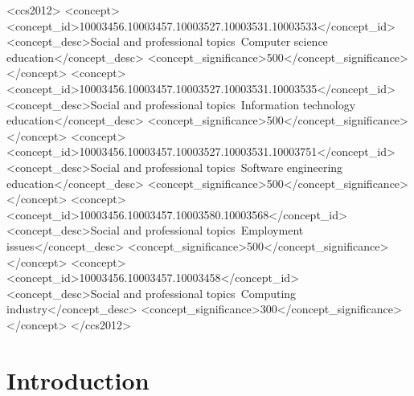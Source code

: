 \documentclass[sigconf]{acmart}
\begin{document}
\begin{CCSXML}
<ccs2012>
<concept>
<concept_id>10003456.10003457.10003527.10003531.10003533</concept_id>
<concept_desc>Social and professional topics~Computer science education</concept_desc>
<concept_significance>500</concept_significance>
</concept>
<concept>
<concept_id>10003456.10003457.10003527.10003531.10003535</concept_id>
<concept_desc>Social and professional topics~Information technology education</concept_desc>
<concept_significance>500</concept_significance>
</concept>
<concept>
<concept_id>10003456.10003457.10003527.10003531.10003751</concept_id>
<concept_desc>Social and professional topics~Software engineering education</concept_desc>
<concept_significance>500</concept_significance>
</concept>
<concept>
<concept_id>10003456.10003457.10003580.10003568</concept_id>
<concept_desc>Social and professional topics~Employment issues</concept_desc>
<concept_significance>500</concept_significance>
</concept>
<concept>
<concept_id>10003456.10003457.10003458</concept_id>
<concept_desc>Social and professional topics~Computing industry</concept_desc>
<concept_significance>300</concept_significance>
</concept>
</ccs2012>
\end{CCSXML}



\maketitle


\section{Introduction}
\end{document}
